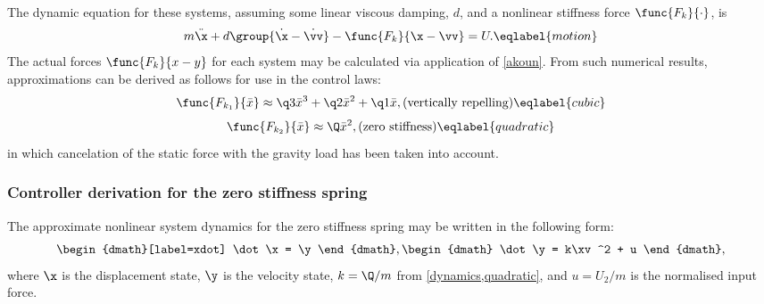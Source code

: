 The dynamic equation for these systems, assuming some linear viscous
damping, $d$, and a nonlinear stiffness force
$\func{F_k}{{\cdot}}$, is
\begin{dmath}
  m\ddot\x + d\group{\dot\x-\dot\vv} - \func{F_k}{\x-\vv} = U .
  \eqlabel{motion}
\end{dmath}
The actual forces $\func{F_k}{x-y}$ for each system may be
calculated via application of \eqref{akoun}. From such numerical
results, approximations can be derived as follows for use in the
control laws:
\begin{dmath}
  \func{F_{k_1}}{\bar x} \approx \q3\bar x^3+\q2\bar x^2+\q1\bar x , \text{(vertically repelling)} \eqlabel{cubic}
\end{dmath}
\begin{dmath}
  \func{F_{k_2}}{\bar x} \approx \Q\bar x^2 , \text{(zero stiffness)} \eqlabel{quadratic}
\end{dmath}
in which cancelation of the static force with the gravity load has
been taken into account.

\subsubsection{Controller derivation for the zero stiffness spring}

The approximate nonlinear system dynamics for the zero stiffness
spring may be written in the following form:
\begin{dgroup}
\begin{dmath}[label=xdot]
\dot \x = \y
\end{dmath},
\begin{dmath}
\dot \y = k\xv^2 + u
\end{dmath},
\end{dgroup}
where $\x$ is the displacement state, $\y$ is the velocity state, $k
= \Q/m$ from \eqref{dynamics,quadratic}, and $u = U_2/m$ is the
normalised input force.

